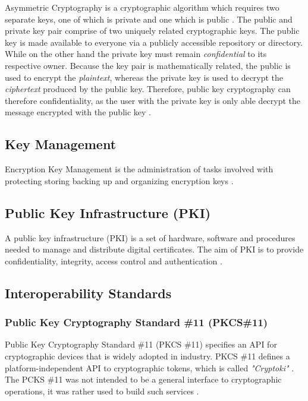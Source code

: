 \documentclass[11pt, a4paper, notitlepage]{article}
\begin{document}
Asymmetric Cryptography is a cryptographic algorithm which requires two separate keys, one of which is private and one which is public \cite{ferguson2003practical}.
The public and private key pair comprise of two uniquely related cryptographic keys. The public key is made available to everyone via a publicly accessible repository or directory. While on the other hand the private key must remain \emph{confidential} to its respective owner. Because the key pair is mathematically related, the public is used to encrypt the \emph{plaintext}, whereas the private key is used to decrypt the \emph{ciphertext} produced by the public key. Therefore, public key cryptography can therefore confidentiality, as the user with the private key is only able decrypt the message encrypted with the public key \cite{pub-key}.



\subsection*{Key Management}
Encryption Key Management is the administration of tasks involved with protecting storing backing up and organizing encryption keys \cite{defination:key-management}. 


\subsection*{Public Key Infrastructure (PKI)}
A public key infrastructure (PKI) is a set of hardware, software and procedures needed to manage and distribute digital certificates. The aim of PKI is to provide confidentiality, integrity, access control and authentication \cite{PKI:Online}.


\subsection*{Interoperability Standards}
\subsubsection*{Public Key Cryptography Standard \#11 (PKCS\#11)}
Public Key Cryptography Standard \#11  (PKCS \#11) specifies an API for cryptographic devices that is widely adopted in industry. PKCS \#11 defines a platform-independent API to cryptographic tokens, which is called \emph{"Cryptoki"} \cite{bortolozzo2010attacking}. The PCKS \#11 was not intended to be a general interface to cryptographic operations, it was rather used to build such services \cite{p}.
\end{document}
